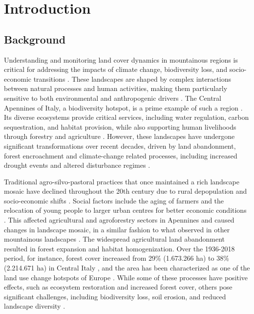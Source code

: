 \documentclass[jimaging,article,submit,pdftex,moreauthors]{Definitions/mdpi}
\begin{document}
\section{Introduction}
\subsection{Background}

Understanding and monitoring land cover dynamics in mountainous regions is critical for addressing the impacts of climate change, biodiversity loss, and socio-economic transitions \cite{VACCHIANO201757,BENGTSSON200039}. These landscapes are shaped by complex interactions between natural processes and human activities, making them particularly sensitive to both environmental and anthropogenic drivers \cite{LASANTA2017810,data7060074,BEBI201743}. The Central Apennines of Italy, a biodiversity hotspot, is a prime example of such a region \cite{Ogwu2024}. Its diverse ecosystems provide critical services, including water regulation, carbon sequestration, and habitat provision, while also supporting human livelihoods through forestry and agriculture \cite{VACCHIANO201757}. However, these landscapes have undergone significant transformations over recent decades, driven by land abandonment, forest encroachment and climate-change related processes, including increased drought events and altered disturbance regimes \cite{SEBASTIANI2024101329,Vitali,BEBI201743}.

Traditional agro-silvo-pastoral practices that once maintained a rich landscape mosaic have declined throughout the 20th century due to rural depopulation and socio-economic shifts \cite{Vitali}. Social factors include the aging of farmers and the relocation of young people to larger urban centres for better economic conditions \cite{MAREGGI2024103358,BRUNORI2007183}. This affected agricultural and agroforestry sectors in Apennines and caused changes in landscape mosaic, in a similar fashion to what observed in other mountainous landscapes \cite{LASANTA2017810,PERPINACASTILLO2021104946,geomatics5010005,Arnaez}. The widespread agricultural land abandonment resulted in forest expansion and habitat homogenization. Over the 1936-2018 period, for instance, forest cover increased from 29\% (1.673.266 ha) to 38\% (2.214.671 ha) in Central Italy \cite{AGNOLETTI2022119655}, and the area has been characterized as one of the land use change hotspots of Europe \cite{Kuemmerle_2016}. While some of these processes have positive effects, such as ecosystem restoration and increased forest cover, others pose significant challenges, including biodiversity loss, soil erosion, and reduced landscape diversity \cite{Falcucci,AMEZTEGUI2021104240}.
\end{document}

